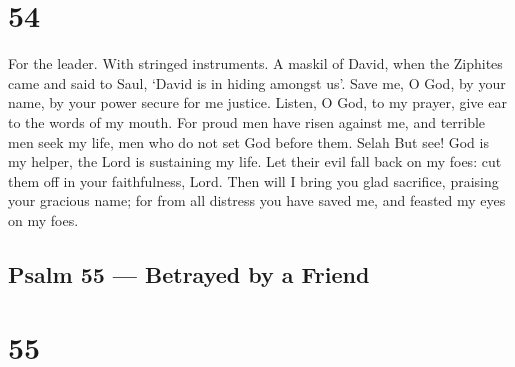 \hypertarget{section-53}{%
\section{54}\label{section-53}}

For the leader. With stringed instruments. A maskil of David, when the
Ziphites came and said to Saul, `David is in hiding amongst us'.
 Save me, O God, by your name, by your power secure for me
justice.  Listen, O God, to my prayer, give ear to the words
of my mouth.  For proud men have risen against me, and
terrible men seek my life, men who do not set God before them. Selah
 But see! God is my helper, the Lord is sustaining my life.
 Let their evil fall back on my foes: cut them off in your
faithfulness, Lord.  Then will I bring you glad sacrifice,
praising your gracious name;  for from all distress you have
saved me, and feasted my eyes on my foes.

\hypertarget{psalm-55-betrayed-by-a-friend}{%
\subsection{Psalm 55 --- Betrayed by a
Friend}\label{psalm-55-betrayed-by-a-friend}}

\hypertarget{section-54}{%
\section{55}\label{section-54}}

